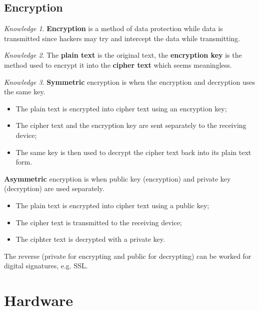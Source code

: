 \documentclass[8pt]{article}
\theoremstyle{remark}
\newtheorem{knowledge}{Knowledge}[subsection]
\begin{document}
        \subsection{Encryption}
            \begin{knowledge}
                \textbf{Encryption} is a method of data protection while data is transmitted since hackers may try and intercept the data while transmitting.
            \end{knowledge}

            \begin{knowledge}
                The \textbf{plain text} is the original text, the \textbf{encryption key} is the method used to encrypt it into the \textbf{cipher text} which seems meaningless.
            \end{knowledge}

            \begin{knowledge}
                \textbf{Symmetric} encryption is when the encryption and decryption uses the same key.
                \begin{itemize}
                    \item The plain text is encrypted into cipher text using an encryption key;
                    \item The cipher text and the encryption key are sent separately to the receiving device;
                    \item The same key is then used to decrypt the cipher text back into its plain text form.
                \end{itemize}

                \textbf{Asymmetric} encryption is when public key (encryption) and private key (decryption) are used separately.
                \begin{itemize}
                    \item The plain text is encrypted into cipher text using a public key;
                    \item The cipher text is transmitted to the receiving device;
                    \item The ciphter text is decrypted with a private key.
                \end{itemize}

                The reverse (private for encrypting and public for decrypting) can be worked for digital signatures, e.g. SSL.
            \end{knowledge}

    \section{Hardware}
        
\end{document}
